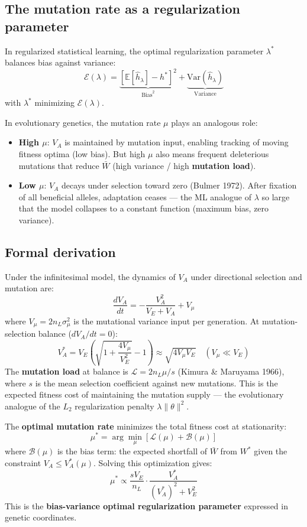 \documentclass[12pt]{article}
\theoremstyle{remark}
\begin{document}
\subsection{The mutation rate as a regularization parameter}

In regularized statistical learning, the optimal regularization parameter $\lambda^*$ balances bias against variance:
\[
  \mathcal{E}(\lambda) = \underbrace{\left[\mathbb{E}[\hat{h}_\lambda] - h^*\right]^2}_{\text{Bias}^2}
  + \underbrace{\mathrm{Var}(\hat{h}_\lambda)}_{\text{Variance}}
\]
with $\lambda^*$ minimizing $\mathcal{E}(\lambda)$.

In evolutionary genetics, the mutation rate $\mu$ plays an analogous role:
\begin{itemize}
  \item \textbf{High $\mu$}: $V_A$ is maintained by mutation input, enabling tracking of moving fitness optima (low bias). But high $\mu$ also means frequent deleterious mutations that reduce $\bar{W}$ (high variance / high \textbf{mutation load}).
  \item \textbf{Low $\mu$}: $V_A$ decays under selection toward zero (Bulmer 1972). After fixation of all beneficial alleles, adaptation ceases --- the ML analogue of $\lambda$ so large that the model collapses to a constant function (maximum bias, zero variance).
\end{itemize}

\subsection{Formal derivation}

Under the infinitesimal model, the dynamics of $V_A$ under directional selection and mutation are:
\[
  \frac{dV_A}{dt} = -\frac{V_A^2}{V_E + V_A} + V_\mu
\]
where $V_\mu = 2n_L \sigma_\mu^2$ is the mutational variance input per generation. At mutation-selection balance ($dV_A/dt = 0$):
\[
  V_A^* = V_E\left(\sqrt{1 + \frac{4V_\mu}{V_E^2}} - 1\right)
  \approx \sqrt{4V_\mu V_E} \quad (V_\mu \ll V_E)
\]
The \textbf{mutation load} at balance is $\mathcal{L} = 2n_L \mu / s$ (Kimura \& Maruyama 1966), where $s$ is the mean selection coefficient against new mutations. This is the expected fitness cost of maintaining the mutation supply --- the evolutionary analogue of the $L_2$ regularization penalty $\lambda \|\theta\|^2$.

The \textbf{optimal mutation rate} minimizes the total fitness cost at stationarity:
\[
  \mu^* = \arg\min_\mu \left[\mathcal{L}(\mu) + \mathcal{B}(\mu)\right]
\]
where $\mathcal{B}(\mu)$ is the bias term: the expected shortfall of $\bar{W}$ from $W^*$ given the constraint $V_A \leq V_A^*(\mu)$. Solving this optimization gives:
\[
  \mu^* \propto \frac{s V_E}{n_L} \cdot \frac{V_A^*}{(V_A^*)^2 + V_E^2}
\]
This is the \textbf{bias-variance optimal regularization parameter} expressed in genetic coordinates.
\end{document}
